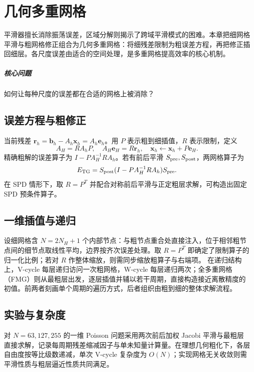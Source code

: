 \chapter{几何多重网格}\label{v0ch:19}
\begin{chaptersummary}
平滑器擅长消除振荡误差，区域分解则揭示了跨域平滑模式的困难。本章把细网格平滑与粗网格修正组合为几何多重网格：将细残差限制为粗误差方程，再把修正插回细层。各尺度误差由适合的空间处理，是多重网格提高效率的核心机制。
\end{chaptersummary}
\paragraph{核心问题}如何让每种尺度的误差都在合适的网格上被消除？

\section{误差方程与粗修正}
当前残差 $\bm r_h=\bm b_h-A_h\bm x_h=A_h\bm e_h$。用 $P$ 表示粗到细插值，$R$ 表示限制，定义
\[
 A_H=RA_hP,\quad A_H\bm e_H=R\bm r_h,\quad
 \bm x_h\leftarrow\bm x_h+P\bm e_H.
\]
精确粗解的误差算子为 $I-PA_H^{-1}RA_h$。若有前后平滑 $S_{\rm pre},S_{\rm post}$，两网格算子为
\[
 E_{\rm TG}=S_{\rm post}(I-PA_H^{-1}RA_h)S_{\rm pre}.
\]
在 SPD 情形下，取 $R=P^T$ 并配合对称前后平滑与正定粗层求解，可构造出固定 SPD 预条件算子。
\section{一维插值与递归}
设细网格含 $N=2N_H+1$ 个内部节点：与粗节点重合处直接注入，位于相邻粗节点间的细节点取线性平均，边界按齐次误差处理。取 $R=P^T$ 即确定了限制算子的归一化比例；若对 $R$ 作整体缩放，则需同步缩放粗算子与右端项。
在递归结构上，V-cycle 每层递归访问一次粗网格，W-cycle 每层递归两次；全多重网格（FMG）则从最粗层出发，逐层插值并辅以若干周期，直接构造接近离散精度的初值。前两者刻画单个周期的遍历方式，后者组织由粗到细的整体求解流程。
\section{实验与复杂度}
对 $N=63,127,255$ 的一维 Poisson 问题采用两次前后加权 Jacobi 平滑与最粗层直接求解，记录每周期残差缩减因子与单未知量计算量。在理想几何粗化下，各层自由度按等比级数递减，单次 V-cycle 复杂度为 $O(N)$；实现网格无关收敛则需平滑性质与粗层逼近性质共同满足。
